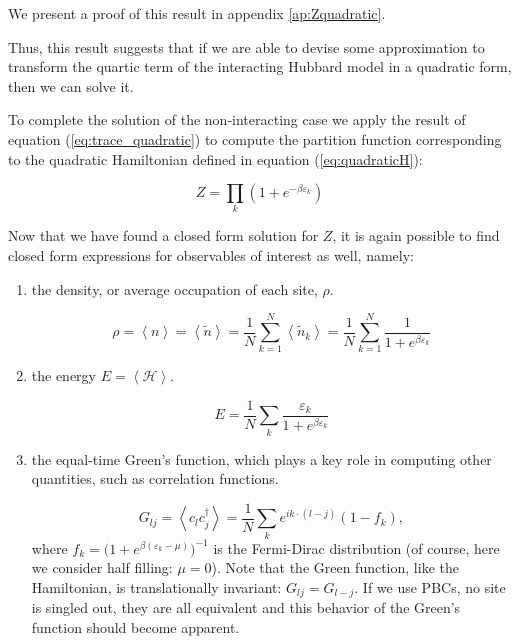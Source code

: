 We present a proof of this result in appendix \ref{ap:Zquadratic}.

Thus, this result suggests that if we are able to devise some approximation to transform the quartic term of the interacting Hubbard model in a quadratic form, then we can solve it.

To complete the solution of the non-interacting case we apply the result of equation (\ref{eq:trace_quadratic}) to compute the partition function corresponding to the quadratic Hamiltonian defined in equation (\ref{eq:quadraticH}):

\begin{equation}
Z = \prod_k ( 1 + e^{-\beta \varepsilon_k} )
\end{equation}

Now that we have found a closed form solution for $Z$, it is again possible to find closed form expressions for observables of interest as well, namely:

\begin{enumerate}
\item the density, or average occupation of each site, $\rho$.

\begin{equation}
\rho = \left\langle n \right\rangle = \left\langle \tilde{n} \right\rangle = \frac{1}{N} \sum_{k=1}^N \left\langle \tilde{n}_k \right\rangle  = \frac{1}{N} \sum_{k=1}^N  \frac{1}{1 + e^{\beta\varepsilon_k}}
\end{equation}

\item the energy $E = \left\langle \mathcal{H} \right\rangle$.

\begin{equation}
E = \frac{1}{N} \sum_k \frac{\varepsilon_k}{1 + e^{\beta\varepsilon_k}}
\end{equation}

\item the equal-time Green's function, which plays a key role in computing other quantities, such as correlation functions.

\begin{equation}
G_{lj} = \left\langle c_l c_j^\dagger \right\rangle = \frac{1}{N} \sum_k e^{ i k \cdot ( l - j ) } ( 1 - f_k ),
\end{equation}
where $f_k = \big(1 + e^{\beta(\varepsilon_k - \mu)} \big)^{-1}$ is the Fermi-Dirac distribution (of course, here we consider half filling: $\mu = 0$).
Note that the Green function, like the Hamiltonian, is translationally invariant: $G_{lj} = G_{l-j}$. 
If we use PBCs, no site is singled out, they are all equivalent and this behavior of the Green's function should become apparent.
\end{enumerate}